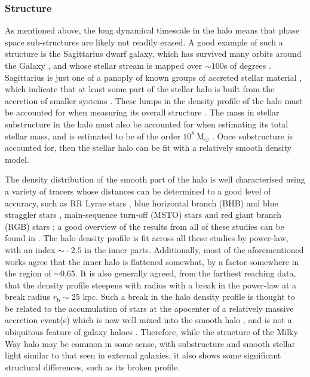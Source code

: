 \subsubsection{Structure}
As mentioned above, the long dynamical timescale in the halo means that phase space sub-structures are likely not readily erased. A good example of such a structure is the Sagittarius dwarf galaxy, which has survived many orbits around the Galaxy \citep[e.g.][]{1997AJ....113..634I}, and whose stellar stream is mapped over $\sim 100$s of degrees \citep[e.g.][]{2003ApJ...596L.191N,2004AJ....128..245M,2006ApJ...642L.137B,2009ApJ...700.1282Y}. Sagittarius is just one of a panoply of known groups of accreted stellar material \citep[see e.g.][for a review]{2013NewAR..57..100B}, which indicate that at least some part of the stellar halo is built from the accretion of smaller systems \citep[as predicted in the seminal work of][which I discuss further in Section \ref{sec:galacticarchaeology}]{1978ApJ...225..357S}. These lumps in the density profile of the halo must be accounted for when measuring its overall structure \citep[e.g.][]{2011MNRAS.416.2903D}. The mass in stellar substructure in the halo must also be accounted for when estimating its total stellar mass, and is estimated to be of the order $10^8\ \mathrm{M_{\odot}}$ \citep[based on a recent review by][]{2016ARA&A..54..529B}. Once substructure is accounted for, then the stellar halo can be fit with a relatively smooth density model.

The density distribution of the smooth part of the halo is well characterised using a variety of tracers whose distances can be determined to a good level of accuracy, such as RR Lyrae stars 
\citep[e.g.][]{2009MNRAS.398.1757W,2010ApJ...708..717S,2013AJ....146...21S,2014ApJ...788..105F}, blue horizontal branch (BHB) and blue straggler stars \citep[e.g.][]{2011MNRAS.416.2903D}, main-sequence turn-off (MSTO) stars \citep[e.g.][]{2011ApJ...731....4S} and red giant branch (RGB) stars \citep[e.g.][]{2015ApJ...809..144X}; a good overview of the results from all of these studies can be found in \citet{2016ARA&A..54..529B}. The halo density profile is fit across all these studies by power-law, with an index $\sim-2.5$ in the inner parts. Additionally, most of the aforementioned works agree that the inner halo is flattened somewhat, by a factor somewhere in the region of $\sim 0.65$. It is also generally agreed, from the farthest reaching data, that the density profile steepens with radius with a break in the power-law at a break radius $r_{\mathrm{b}}\sim 25$ kpc. Such a break in the halo density profile is thought to be related to the accumulation of stars at the apocenter of a relatively massive accretion event(s) which is now well mixed into the smooth halo \citep{2013ApJ...763..113D}, and is not a ubiquitous feature of galaxy haloes \citep[a good example being the lack of such a break in M31, e.g.][]{2011ApJ...739...20C}. Therefore, while the structure of the Milky Way halo may be common in some sense, with substructure and smooth stellar light similar to that seen in external galaxies, it also shows some significant structural differences, such as its broken profile.

